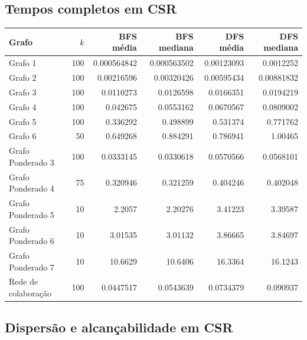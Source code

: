 \documentclass[a4paper,12pt]{article}
\begin{document}
\subsection{Tempos completos em CSR}
\par\smallskip\noindent\begin{minipage}{\textwidth}\centering
\begingroup\fontsize{8.7}{10.7}\selectfont
\setlength{\tabcolsep}{4pt}
\begin{tabular}{lrrrrr}
\toprule
Grafo & $k$ & BFS média & BFS mediana & DFS média & DFS mediana \\
\midrule
Grafo 1 & 100 & \num{0.000564842} & \num{0.000563502} & \num{0.00123093} & \num{0.0012252} \\
Grafo 2 & 100 & \num{0.00216596} & \num{0.00320426} & \num{0.00595434} & \num{0.00881832} \\
Grafo 3 & 100 & \num{0.0110273} & \num{0.0126598} & \num{0.0166351} & \num{0.0194219} \\
Grafo 4 & 100 & \num{0.042675} & \num{0.0553162} & \num{0.0670567} & \num{0.0809002} \\
Grafo 5 & 100 & \num{0.336292} & \num{0.498899} & \num{0.531374} & \num{0.771762} \\
Grafo 6 & 50 & \num{0.649268} & \num{0.884291} & \num{0.786941} & \num{1.00465} \\
Grafo Ponderado 3 & 100 & \num{0.0333145} & \num{0.0330618} & \num{0.0570566} & \num{0.0568101} \\
Grafo Ponderado 4 & 75 & \num{0.320946} & \num{0.321259} & \num{0.404246} & \num{0.402048} \\
Grafo Ponderado 5 & 10 & \num{2.2057} & \num{2.20276} & \num{3.41223} & \num{3.39587} \\
Grafo Ponderado 6 & 10 & \num{3.01535} & \num{3.01132} & \num{3.86665} & \num{3.84697} \\
Grafo Ponderado 7 & 10 & \num{10.6629} & \num{10.6406} & \num{16.3364} & \num{16.1243} \\
Rede de colaboração & 100 & \num{0.0447517} & \num{0.0543639} & \num{0.0734379} & \num{0.090937} \\
\bottomrule
\end{tabular}
\endgroup
{}
\end{minipage}\par\smallskip
\clearpage\subsection{Dispersão e alcançabilidade em CSR}
\end{document}

